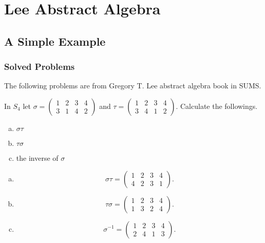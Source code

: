 \chapter{Lee Abstract Algebra}

\section{A Simple Example}

\subsection{Solved Problems}
The following problems are from Gregory T. Lee abstract algebra book in SUMS.
\begin{problem}
	In $ S_4 $ let $ \sigma = \begin{pmatrix} 1 & 2 & 3 & 4 \\ 3 & 1 & 4 & 2 \end{pmatrix} $ and $ \tau  = \begin{pmatrix} 1 & 2 & 3 & 4 \\ 3 & 4 & 1 & 2 \end{pmatrix} $. Calculate the followings.
	\begin{enumerate}[(a)]
		\item $ \sigma \tau $
		\item $ \tau\sigma $
		\item the inverse of $ \sigma $
	\end{enumerate}
\end{problem}
\begin{solution}
	\begin{enumerate}[(a)]
		\item 
		\[ \sigma\tau = \begin{pmatrix} 1 & 2 & 3 & 4 \\ 4 & 2 & 3 & 1 \end{pmatrix}. \]
		\item 
		\[ \tau \sigma = \begin{pmatrix} 1 & 2 & 3 & 4 \\ 1 & 3 & 2 & 4 \end{pmatrix}. \]
		\item \[ \sigma^{-1} = \begin{pmatrix} 1 & 2 & 3 & 4 \\ 2 & 4 & 1 & 3 \end{pmatrix}. \]
	\end{enumerate}
\end{solution}

